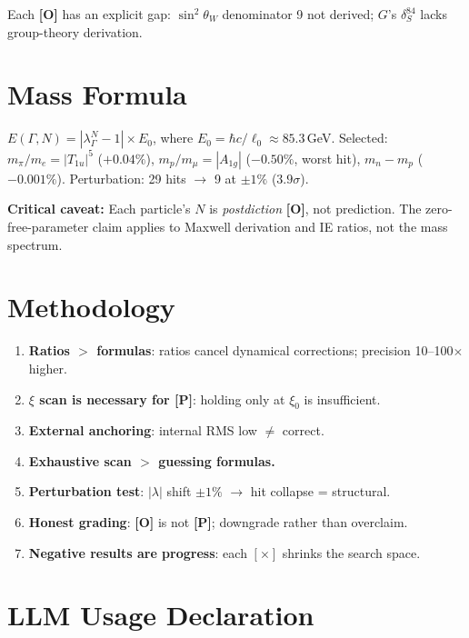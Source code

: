 \documentclass[11pt,a4paper]{article}
\newcommand{\gradeP}{\textbf{[P]}}
\newcommand{\gradeO}{\textbf{[O]}}
\begin{document}
Each \gradeO{} has an explicit gap: $\sin^2\theta_W$ denominator 9 not derived; $G$'s $\delta_S^{84}$ lacks group-theory derivation.

\section{Mass Formula}\label{sec:mass}

$E(\Gamma, N) = |\lambda_\Gamma^N - 1|\times E_0$, where $E_0 = \hbar c/\ell_0 \approx 85.3$\,GeV. Selected:
$m_\pi/m_e = |T_{1u}|^5$ ($+0.04\%$), $m_p/m_\mu = |A_{1g}|$ ($-0.50\%$, worst hit), $m_n{-}m_p$ ($-0.001\%$). Perturbation: 29 hits $\to$ 9 at $\pm 1\%$ ($3.9\sigma$).

\textbf{Critical caveat:} Each particle's $N$ is \emph{postdiction} \gradeO, not prediction. The zero-free-parameter claim applies to Maxwell derivation and IE ratios, not the mass spectrum.

\section{Methodology}\label{sec:methodology}

\begin{enumerate}[nosep]
\item \textbf{Ratios $>$ formulas}: ratios cancel dynamical corrections; precision 10--100$\times$ higher.
\item \textbf{$\xi$ scan is necessary for \gradeP}: holding only at $\xi_0$ is insufficient.
\item \textbf{External anchoring}: internal RMS low $\neq$ correct.
\item \textbf{Exhaustive scan $>$ guessing formulas.}
\item \textbf{Perturbation test}: $|\lambda|$ shift $\pm 1\%$ $\to$ hit collapse = structural.
\item \textbf{Honest grading}: \gradeO{} is not \gradeP; downgrade rather than overclaim.
\item \textbf{Negative results are progress}: each $[\times]$ shrinks the search space.
\end{enumerate}

\section{LLM Usage Declaration}\label{sec:llm}
\end{document}
